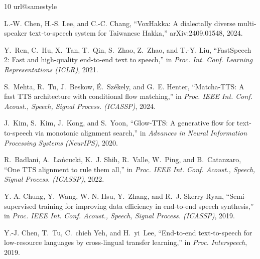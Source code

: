 \documentclass[conference,a4paper]{IEEEtran}
\begin{document}
\begin{thebibliography}{10}
\providecommand{\url}[1]{#1}
\csname url@samestyle\endcsname
\providecommand{\newblock}{\relax}
\providecommand{\bibinfo}[2]{#2}
\providecommand{\BIBentrySTDinterwordspacing}{\spaceskip=0pt\relax}
\providecommand{\BIBentryALTinterwordstretchfactor}{4}
\providecommand{\BIBentryALTinterwordspacing}{\spaceskip=\fontdimen2\font plus
\BIBentryALTinterwordstretchfactor\fontdimen3\font minus
  \fontdimen4\font\relax}
\providecommand{\BIBforeignlanguage}[2]{{%
\expandafter\ifx\csname l@#1\endcsname\relax
\typeout{** WARNING: IEEEtran.bst: No hyphenation pattern has been}%
\typeout{** loaded for the language `#1'. Using the pattern for}%
\typeout{** the default language instead.}%
\else
\language=\csname l@#1\endcsname
\fi
#2}}
\providecommand{\BIBdecl}{\relax}
\BIBdecl

L.-W. Chen, H.-S. Lee, and C.-C. Chang, ``{VoxHakka}: A dialectally diverse
  multi-speaker text-to-speech system for {Taiwanese Hakka},''
  arXiv:2409.01548, 2024.

Y.~Ren, C.~Hu, X.~Tan, T.~Qin, S.~Zhao, Z.~Zhao, and T.-Y. Liu, ``{FastSpeech
  2}: Fast and high-quality end-to-end text to speech,'' in \emph{Proc. Int.
  Conf. Learning Representations (ICLR)}, 2021.

S.~Mehta, R.~Tu, J.~Beskow, {\'E}.~Sz{\'e}kely, and G.~E. Henter,
  ``{Matcha-TTS}: A fast {TTS} architecture with conditional flow matching,''
  in \emph{Proc. IEEE Int. Conf. Acoust., Speech, Signal Process. (ICASSP)},
  2024.

J.~Kim, S.~Kim, J.~Kong, and S.~Yoon, ``{Glow-TTS}: A generative flow for
  text-to-speech via monotonic alignment search,'' in \emph{Advances in Neural
  Information Processing Systems (NeurIPS)}, 2020.

R.~Badlani, A.~{\L}a{\'n}cucki, K.~J. Shih, R.~Valle, W.~Ping, and
  B.~Catanzaro, ``One {TTS} alignment to rule them all,'' in \emph{Proc. IEEE
  Int. Conf. Acoust., Speech, Signal Process. (ICASSP)}, 2022.

Y.-A. Chung, Y.~Wang, W.-N. Hsu, Y.~Zhang, and R.~J. Skerry-Ryan,
  ``Semi-supervised training for improving data efficiency in end-to-end speech
  synthesis,'' in \emph{Proc. IEEE Int. Conf. Acoust., Speech, Signal Process.
  (ICASSP)}, 2019.

Y.-J. Chen, T.~Tu, C.~chieh Yeh, and H.~yi~Lee, ``End-to-end text-to-speech for
  low-resource languages by cross-lingual transfer learning,'' in \emph{Proc.
  Interspeech}, 2019.


\end{thebibliography}
\end{document}
